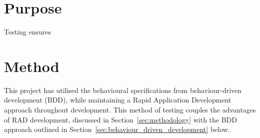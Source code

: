 
\section{Purpose} {
\label{sec:testing_purpose}


	Testing ensures 


}

\section{Method} {
\label{sec:testing_method}

	This project has utilised the behavioural specifications from behaviour-driven development (BDD), while maintaining a Rapid Application Development approach throughout development. This method of testing couples the advantages of RAD development, discussed in Section~\ref{sec:methodology} with the BDD approach outlined in Section~\ref{sec:behaviour_driven_development} below.

}

